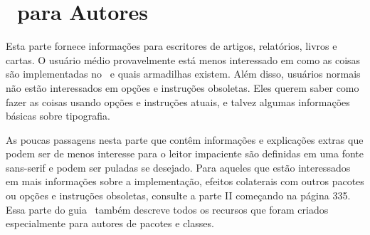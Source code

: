 \chapter{\KOMAScript\ para Autores}
Esta parte fornece informações para escritores de artigos, relatórios, livros e cartas. O usuário médio provavelmente está menos interessado em como as coisas são implementadas no \KOMAScript\ e quais armadilhas existem. Além disso, usuários normais não estão interessados em opções e instruções obsoletas. Eles querem saber como fazer as coisas usando opções e instruções atuais, e talvez algumas informações básicas sobre tipografia.

As poucas passagens nesta parte que contêm informações e explicações extras que podem ser de menos interesse para o leitor impaciente são definidas em uma fonte sans-serif e podem ser puladas se desejado. Para aqueles que estão interessados em mais informações sobre a implementação, efeitos colaterais com outros pacotes ou opções e instruções obsoletas, consulte a parte II começando na página 335. Essa parte do guia \KOMAScript\ também descreve todos os recursos que foram criados especialmente para autores de pacotes e classes.
